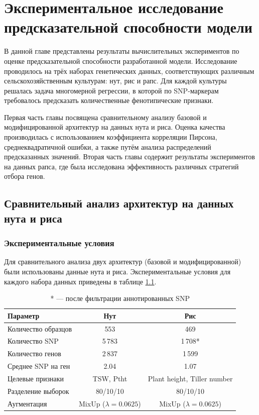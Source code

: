 \chapter{Экспериментальное исследование предсказательной способности модели}

\noindent
В данной главе представлены результаты вычислительных экспериментов 
по оценке предсказательной способности разработанной модели. 
Исследование проводилось на трёх наборах генетических данных, 
соответствующих различным сельскохозяйственным культурам: нут, 
рис и рапс. Для каждой культуры решалась задача многомерной 
регрессии, в которой по SNP-маркерам требовалось предсказать 
количественные фенотипические признаки.

Первая часть главы посвящена сравнительному анализу базовой и 
модифицированной архитектур на данных нута и риса. Оценка качества 
производилась с использованием коэффициента корреляции Пирсона, 
среднеквадратичной ошибки, а также путём анализа распределений 
предсказанных значений. Вторая часть главы содержит результаты 
экспериментов на данных рапса, где была исследована эффективность 
различных стратегий отбора генов.

\section{Сравнительный анализ архитектур на данных нута и риса}

\subsection{Экспериментальные условия}

Для сравнительного анализа двух архитектур (базовой и модифицированной) 
были использованы данные нута и риса. Экспериментальные условия для 
каждого набора данных приведены в таблице \ref{tab:exp_conditions}.

\begin{table}
	\centering
	\caption{Условия проведения экспериментов}
	\label{tab:exp_conditions}
	\begin{tabular}{|l|c|c|}
		\hline
		\textbf{Параметр} & \textbf{Нут} & \textbf{Рис} \\ \hline
		Количество образцов & 553 & 469 \\ \hline
		Количество SNP & 5\,783 & 1\,708* \\ \hline
		Количество генов & 2\,837 & 1\,599 \\ \hline
		Среднее SNP на ген & 2.04 & 1.07 \\ \hline
		Целевые признаки & TSW, Ptht & Plant height, Tiller number \\ \hline
		Разделение выборок & 80/10/10 & 80/10/10 \\ \hline
		Аугментация & MixUp ($\lambda=0.0625$) & MixUp ($\lambda=0.0625$) \\ \hline
	\end{tabular}
	\caption*{* --- после фильтрации аннотированных SNP}
\end{table}

